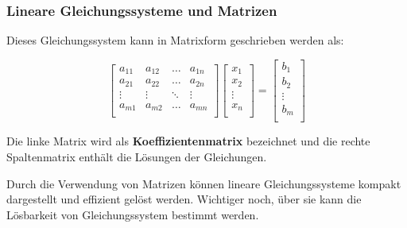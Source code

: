 \documentclass{beamer}
\begin{document}
\begin{frame}
  \frametitle{Lineare Gleichungssysteme und Matrizen}
  Dieses Gleichungssystem kann in Matrixform geschrieben werden als:
  
  \[
  \begin{bmatrix}
    a_{11} & a_{12} & \ldots & a_{1n} \\
    a_{21} & a_{22} & \ldots & a_{2n} \\
    \vdots & \vdots & \ddots & \vdots \\
    a_{m1} & a_{m2} & \ldots & a_{mn} \\
  \end{bmatrix}
  \begin{bmatrix}
    x_1 \\
    x_2 \\
    \vdots \\
    x_n \\
  \end{bmatrix}
  =
  \begin{bmatrix}
    b_1 \\
    b_2 \\
    \vdots \\
    b_m \\
  \end{bmatrix}
  \]
  
  Die linke Matrix wird als \textbf{Koeffizientenmatrix} bezeichnet und die rechte Spaltenmatrix enthält die Lösungen der Gleichungen.
  
  \vspace{0.3cm}
  
  Durch die Verwendung von Matrizen können lineare Gleichungssysteme kompakt dargestellt und effizient gelöst werden. Wichtiger noch, über sie kann die Lösbarkeit von Gleichungssystem bestimmt werden.
\end{frame}
\end{document}
